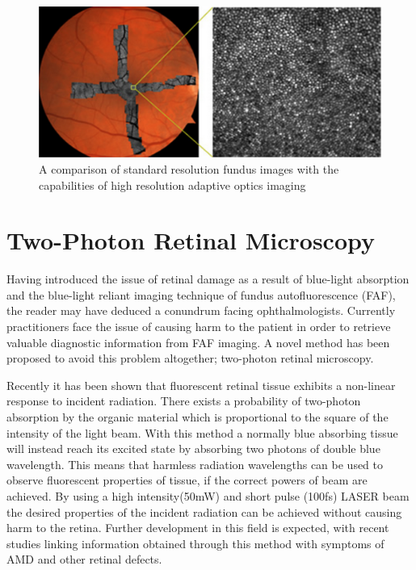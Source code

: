 \begin{figure}[htbp]
\centering
\includegraphics{figures/ao}
\caption{A comparison of standard resolution fundus images with the capabilities of high resolution adaptive optics imaging}
\label{fig:ao}
\end{figure}

\section{Two-Photon Retinal Microscopy}

Having introduced the issue of retinal damage as a result of blue-light
absorption and the blue-light reliant imaging technique of fundus autofluorescence
(FAF), the reader may have deduced a conundrum facing ophthalmologists. Currently
practitioners face the issue of causing harm to the patient in order to retrieve
valuable diagnostic information from FAF imaging. A novel method has been proposed
to avoid this problem altogether; two-photon retinal microscopy.

Recently it has been shown that fluorescent retinal tissue exhibits a non-linear
response to incident radiation. \cite{denk1990two} There exists a probability of
two-photon absorption by the organic material which is proportional to the square
of the intensity of the light beam. With this method a normally blue absorbing
tissue will instead reach its excited state by absorbing two photons of double
blue wavelength. This means that harmless radiation wavelengths can be used to
observe fluorescent properties of tissue, if the correct powers of beam are
achieved. By using a high intensity(50mW) and short pulse (100fs) LASER beam the
desired properties of the incident radiation can be achieved without causing harm
to the retina. Further development in this field is expected, with recent studies
linking information obtained through this method with symptoms of AMD and other
retinal defects.\cite{palczewska2010noninvasive,palczewska2014noninvasive}

